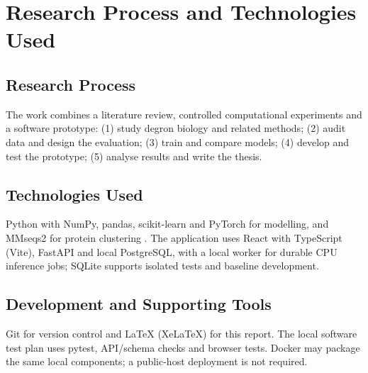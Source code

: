 \section{Research Process and Technologies Used}
\subsection{Research Process}
The work combines a literature review, controlled computational experiments and a software prototype:
(1) study degron biology and related methods; (2) audit data and design the evaluation; (3) train and
compare models; (4) develop and test the prototype; (5) analyse results and write the thesis.

\subsection{Technologies Used}
Python with NumPy, pandas, scikit-learn and PyTorch for modelling, and MMseqs2 for protein clustering
\citep{steinegger2017}. The application uses React with TypeScript (Vite), FastAPI and local PostgreSQL,
with a local worker for durable CPU inference jobs; SQLite supports isolated tests and baseline development.

\subsection{Development and Supporting Tools}
Git for version control and \LaTeX{} (XeLaTeX) for this report. The local software test plan uses pytest,
API/schema checks and browser tests. Docker may package the same local components; a public-host
deployment is not required.

